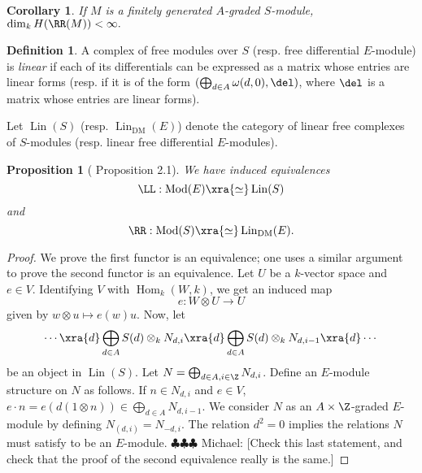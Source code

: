 \documentclass[12pt]{amsart}
\newtheorem{prop}[lemma]{Proposition}
\newtheorem{cor}[lemma]{Corollary}
\theoremstyle{definition}
\newtheorem{defn}[lemma]{Definition}
\theoremstyle{remark}
\newtheorem{rem}[lemma]{Remark}
\newcommand{\Hom}{\operatorname{Hom}} %
\newcommand{\daniel}[1]{{\color{blue} \sf $\clubsuit\clubsuit\clubsuit$ Daniel: [#1]}}
\newcommand{\michael}[1]{{\color{red} \sf $\clubsuit\clubsuit\clubsuit$ Michael: [#1]}}
\def\on{\operatorname}
\def\DM{\operatorname{DM}}
\def\Mod{\operatorname{Mod}}
\def\o{\omega}
\begin{document}
\begin{cor}\label{cor:RM high degree}
If $M$ is a finitely generated $A$-graded $S$-module, $\dim_k H(\RR(M)) < \infty.$
\end{cor}





\begin{defn}
A complex of free modules over $S$ (resp. free differential $E$-module) is \emph{linear} if each of its differentials can be expressed as a matrix whose entries are linear forms (resp. if it is of the form $(\bigoplus_{d \in A} \o(d, 0), \del)$, where $\del$ is a matrix whose entries are linear forms). 

Let $\on{Lin}(S)$ (resp. $\on{Lin}_{\DM}(E)$) denote the category of linear free complexes of $S$-modules (resp. linear free differential $E$-modules).
\end{defn}


\begin{prop}[\cite{EFS} Proposition 2.1] We have induced equivalences
$$
\LL :  \Mod(E) \xra{\simeq} \on{Lin}(S)
$$
and
$$
\RR :\Mod(S) \xra{\simeq} \on{Lin}_{\DM}(E).
$$
\end{prop}


\begin{proof}
We prove the first functor is an equivalence; one uses a similar argument to prove the second functor is an equivalence. Let $U$ be a $k$-vector space and $e \in V$. Identifying $V$ with $\Hom_k(W, k)$, we get an induced map
$$
e : W \otimes U \to U
$$
given by $w \otimes u \mapsto e(w)u$. Now, let
$$
\cdots \xra{d} \bigoplus_{d \in A}S(d)  \otimes_k N_{d,i}  \xra{d} \bigoplus_{d \in A} S(d) \otimes_k N_{d, i-1} \xra{d} \cdots
$$
be an object in $\on{Lin}(S)$. Let $N = \bigoplus_{d \in A, i \in \Z} N_{d, i}$. Define an $E$-module structure on $N$ as follows. If $n \in N_{d,i}$ and $e \in V$, $e \cdot n = e(d(1 \otimes n)) \in \bigoplus_{d \in A} N_{d, i-1}$. We consider $N$ as an $A \times \Z$-graded $E$-module by defining $N_{(d, i)} = N_{-d, i}$. The relation $d^2 = 0$ implies the relations $N$ must satisfy to be an $E$-module. \michael{Check this last statement, and check that the proof of the second equivalence really is the same.}
\end{proof}
\end{document}

